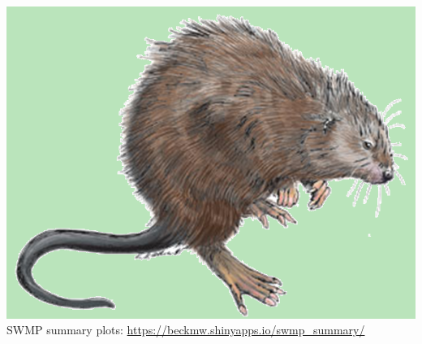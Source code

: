 \documentclass[serif]{beamer}\usepackage[]{graphicx}\usepackage[]{color}
\begin{document}
\begin{frame}[t, fragile]{\includegraphics[width=0.05\paperwidth]{fig/muskrat.png}\hspace{0.07in}{\bf SWMPrats.net: Widgets}}
SWMP summary plots: \href{https://beckmw.shinyapps.io/swmp_summary/}{https://beckmw.shinyapps.io/swmp\_summary/}\\~\\
\centerline{}
\end{frame}
\end{document}
